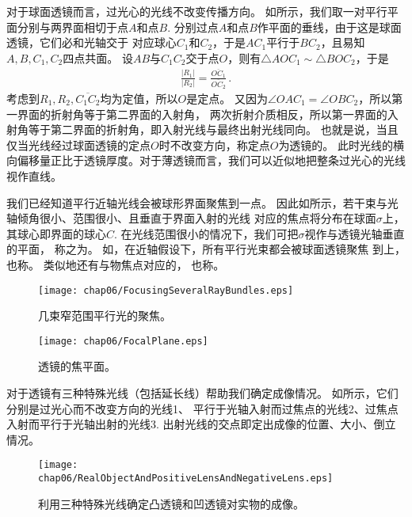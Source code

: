 对于球面透镜而言，过光心的光线不改变传播方向。
如所示，我们取一对平行平面分别与两界面相切于点$A$和点$B$.
分别过点$A$和点$B$作平面的垂线，由于这是球面透镜，它们必和光轴交于
对应球心$C_1$和$C_2$，于是$AC_1$平行于$BC_2$，且易知$A, B, C_1, C_2$四点共面。
设$AB$与$C_1C_2$交于点$O$，则有$\triangle AOC_1\sim\triangle BOC_2$，于是
\begin{align}
    \frac{|R_1|}{|R_2|}=\frac{\overline{OC_1}}{\overline{OC_2}}\, .
\end{align}
考虑到$R_1, R_2, \overline{C_1C_2}$均为定值，所以$O$是定点。
又因为$\angle OAC_1=\angle OBC_2$，所以第一界面的折射角等于第二界面的入射角，
两次折射介质相反，所以第一界面的入射角等于第二界面的折射角，即入射光线与最终出射光线同向。
也就是说，当且仅当光线经过球面透镜的定点$O$时不改变方向，称定点$O$为透镜的。
此时光线的横向偏移量正比于透镜厚度。对于薄透镜而言，我们可以近似地把整条过光心的光线视作直线。

我们已经知道平行近轴光线会被球形界面聚焦到一点。
因此如所示，若干束与光轴倾角很小、范围很小、且垂直于界面入射的光线
对应的焦点将分布在球面$\sigma$上，其球心即界面的球心$C$.
在光线范围很小的情况下，我们可把$\sigma$视作与透镜光轴垂直的平面，
称之为。
如，在近轴假设下，所有平行光束都会被球面透镜聚焦
到上，
也称。
类似地还有与物焦点对应的，
也称。
\begin{figure}[htbp]
    \centering\texttt{[image: chap06/FocusingSeveralRayBundles.eps]}
    \caption{几束窄范围平行光的聚焦。}
    \label{fig:6.36}
\end{figure}
\begin{figure}[htbp]
    \centering\texttt{[image: chap06/FocalPlane.eps]}
    \caption{透镜的焦平面。}
    \label{fig:6.37}
\end{figure}

对于透镜有三种特殊光线（包括延长线）帮助我们确定成像情况。
如所示，它们分别是过光心而不改变方向的光线1、
平行于光轴入射而过焦点的光线2、过焦点入射而平行于光轴出射的光线3.
出射光线的交点即定出成像的位置、大小、倒立情况。
\begin{figure}[htbp]
    \centering\texttt{[image: chap06/RealObjectAndPositiveLensAndNegativeLens.eps]}
    \caption{利用三种特殊光线确定凸透镜和凹透镜对实物的成像。}
    \label{fig:6.38}
\end{figure}

